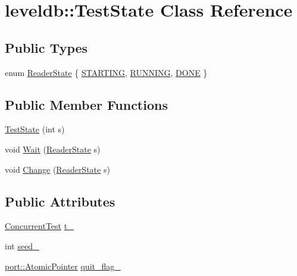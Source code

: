 \hypertarget{classleveldb_1_1_test_state}{}\section{leveldb\+:\+:Test\+State Class Reference}
\label{classleveldb_1_1_test_state}
\subsection*{Public Types}
\begin{DoxyCompactItemize}
\item 
enum \hyperlink{classleveldb_1_1_test_state_a1bf1f0a16815237ff1f29d2925d9a4ad}{Reader\+State} \{ \hyperlink{classleveldb_1_1_test_state_a1bf1f0a16815237ff1f29d2925d9a4ada93ff507fceeb18ff487d343ce24e49fb}{S\+T\+A\+R\+T\+I\+N\+G}, 
\hyperlink{classleveldb_1_1_test_state_a1bf1f0a16815237ff1f29d2925d9a4adab21481f14b9bab70778076d33ea574da}{R\+U\+N\+N\+I\+N\+G}, 
\hyperlink{classleveldb_1_1_test_state_a1bf1f0a16815237ff1f29d2925d9a4ada5d7f032453f326a46f7ebd8b3f0c7d83}{D\+O\+N\+E}
 \}
\end{DoxyCompactItemize}
\subsection*{Public Member Functions}
\begin{DoxyCompactItemize}
\item 
\hyperlink{classleveldb_1_1_test_state_a777f2182bef5c524d580dc26ec589c2d}{Test\+State} (int s)
\item 
void \hyperlink{classleveldb_1_1_test_state_ab11f5574ad50202e18e8274e16953f0a}{Wait} (\hyperlink{classleveldb_1_1_test_state_a1bf1f0a16815237ff1f29d2925d9a4ad}{Reader\+State} s)
\item 
void \hyperlink{classleveldb_1_1_test_state_ae63a695f700220714efa0e622511740c}{Change} (\hyperlink{classleveldb_1_1_test_state_a1bf1f0a16815237ff1f29d2925d9a4ad}{Reader\+State} s)
\end{DoxyCompactItemize}
\subsection*{Public Attributes}
\begin{DoxyCompactItemize}
\item 
\hyperlink{classleveldb_1_1_concurrent_test}{Concurrent\+Test} \hyperlink{classleveldb_1_1_test_state_a090fd0c59fb141c4843511b4020f05e9}{t\+\_\+}
\item 
int \hyperlink{classleveldb_1_1_test_state_aa44f519b574945b0061c88df42fd4725}{seed\+\_\+}
\item 
\hyperlink{classleveldb_1_1port_1_1_atomic_pointer}{port\+::\+Atomic\+Pointer} \hyperlink{classleveldb_1_1_test_state_a04e07cf69866e925db3fafd5cf9fa23f}{quit\+\_\+flag\+\_\+}
\end{DoxyCompactItemize}


